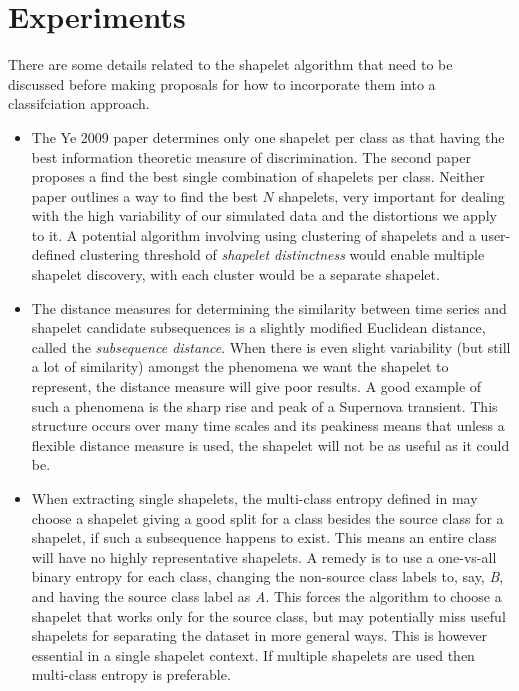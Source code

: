 \section{Experiments}
There are some details related to the shapelet algorithm that need to be discussed before making proposals for how to incorporate them into a classifciation approach.
\begin{itemize}
	\item The Ye 2009  paper determines only one shapelet per class as that having the best information theoretic measure of discrimination. The second paper proposes a find the best single combination of shapelets per class. Neither paper outlines a way to find the best $N$ shapelets, very important for dealing with the high variability of our simulated data and the distortions we apply to it. A potential algorithm involving using clustering of shapelets and a user-defined clustering threshold of \emph{shapelet distinctness} would enable multiple shapelet discovery, with each cluster would be a separate shapelet.
	\item The distance measures for determining the similarity between time series and shapelet candidate subsequences is a slightly modified Euclidean distance, called the \emph{subsequence distance}. When there is even slight variability (but still a lot of similarity) amongst the phenomena we want the shapelet to represent, the distance measure will give poor results. A good example of such a phenomena is the sharp rise and peak of a Supernova transient. This structure occurs over many time scales and its peakiness means that unless a flexible distance measure is used, the shapelet will not be as useful as it could be. %
	\item When extracting single shapelets, the multi-class entropy defined in \citep{mueen2011logical} may choose a shapelet giving a good split for a class besides the source class for a shapelet, if such a subsequence happens to exist. This means an entire class will have no highly representative shapelets. A remedy is to use a one-vs-all binary entropy for each class, changing the non-source class labels to, say, \emph{B}, and having the source class label as \emph{A}.  This forces the algorithm to choose a shapelet that works only for the source class, but may potentially miss useful shapelets for separating the dataset in more general ways. This is however essential in a single shapelet context. If multiple shapelets are used then multi-class entropy is preferable. %

\end{itemize}
